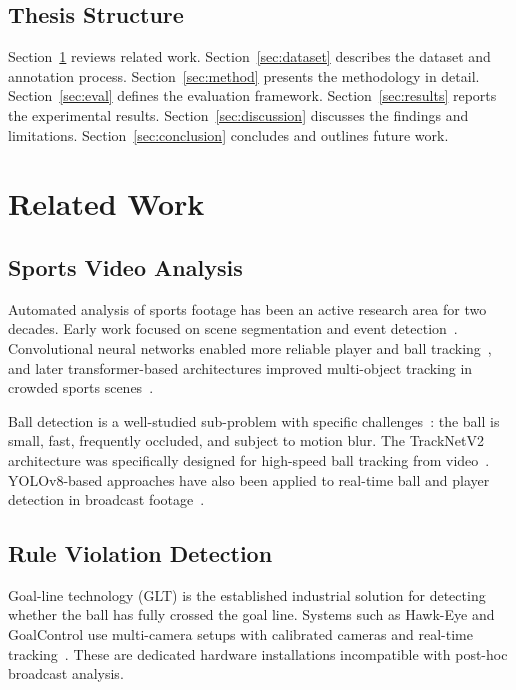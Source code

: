 \documentclass[12pt,a4paper,twoside]{article}
\begin{document}
\subsection{Thesis Structure}

Section~\ref{sec:related} reviews related work. Section~\ref{sec:dataset}
describes the dataset and annotation process. Section~\ref{sec:method} presents
the methodology in detail. Section~\ref{sec:eval} defines the evaluation
framework. Section~\ref{sec:results} reports the experimental results.
Section~\ref{sec:discussion} discusses the findings and limitations.
Section~\ref{sec:conclusion} concludes and outlines future work.


\section{Related Work}
\label{sec:related}

\subsection{Sports Video Analysis}

Automated analysis of sports footage has been an active research area for two
decades. Early work focused on scene segmentation and event
detection~\cite{ekin2003automatic}.
Convolutional neural networks enabled more reliable player and ball
tracking~\cite{suda2021football}, and later transformer-based architectures
improved multi-object tracking in crowded sports scenes~\cite{yu2022sportsmot}.

Ball detection is a well-studied sub-problem with specific
challenges~\cite{theagarajan2018soccer}: the ball is small, fast, frequently
occluded, and subject to motion blur. The TrackNetV2 architecture was
specifically designed for high-speed ball tracking from video~\cite{huang2019tracknet}.
YOLOv8-based approaches have also been applied to real-time ball and player
detection in broadcast footage~\cite{ultralytics2023}.

\subsection{Rule Violation Detection}

Goal-line technology (GLT) is the established industrial solution for
detecting whether the ball has fully crossed the goal line. Systems such as
Hawk-Eye and GoalControl use multi-camera setups with calibrated cameras and
real-time tracking~\cite{hawk2012}. These are dedicated hardware installations
incompatible with post-hoc broadcast analysis.
\end{document}
